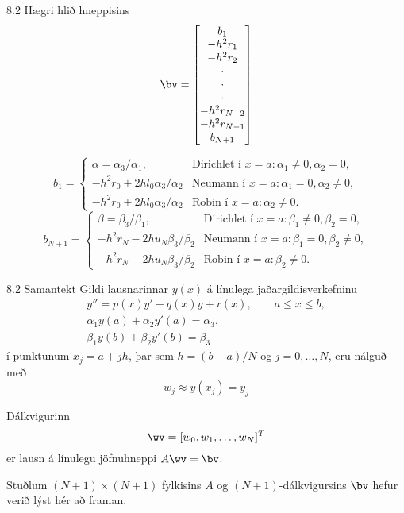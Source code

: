 \begin{frame}{8.2 Hægri hlið hneppisins} 
$$
\bv=\left[
\begin{matrix}
b_1 \\ -h^2r_1\\ -h^2r_2\\ \cdot \\ \cdot\\ \cdot\\
-h^2r_{N-2}\\ -h^2r_{N-1}\\ b_{N+1}
\end{matrix}\right]
$$

$$
b_{1}=
\begin{cases}
  \alpha=\alpha_3/\alpha_1,
&\text{Dirichlet í } x=a: \alpha_1\neq 0, \alpha_2=0,\\
-h^2r_0+2hl_0\alpha_3/\alpha_2
&\text{Neumann í } x=a:  \alpha_1=0, \alpha_2\neq 0,\\
-h^2r_0+2hl_0\alpha_3/\alpha_2&\text{Robin í } x=a:  \alpha_2\neq 0.
\end{cases} 
$$
$$
b_{N+1}=
\begin{cases}
  \beta=\beta_3/\beta_1,
&\text{Dirichlet í } x=a: \beta_1\neq 0, \beta_2=0,\\
-h^2r_N-2hu_N\beta_3/\beta_2&\text{Neumann í } x=a:  \beta_1=0, \beta_2\neq 0,\\
-h^2r_N-2hu_N\beta_3/\beta_2&\text{Robin í } x=a:  \beta_2\neq 0.
\end{cases} 
$$
\end{frame}


\begin{frame}{8.2 Samantekt} 
Gildi lausnarinnar $y(x)$ á  línulega jaðargildisverkefninu
  \begin{gather*}
    y''=p(x)y'+q(x)y+r(x), \qquad a\leq x\leq b,\\
\alpha_1y(a)+\alpha_2 y'(a)=\alpha_3,\\
\beta_1 y(b)+\beta_2y'(b)=\beta_3  
  \end{gather*}
í punktunum $x_j=a+jh$, þar sem $h=(b-a)/N$ og $j=0,\dots,N$,
eru nálguð með
$$
w_j\approx y(x_j)=y_j
$$ 

\pause
\smallskip
Dálkvigurinn
$$
\wv=[w_0,w_1,\dots,w_N]^T
$$
er lausn á línulegu jöfnuhneppi
$A\wv=\bv$.

\smallskip
Stuðlum $(N+1)\times(N+1)$ fylkisins $A$ og
$(N+1)$-dálkvigursins $\bv$ hefur verið lýst hér að framan.
\end{frame}


